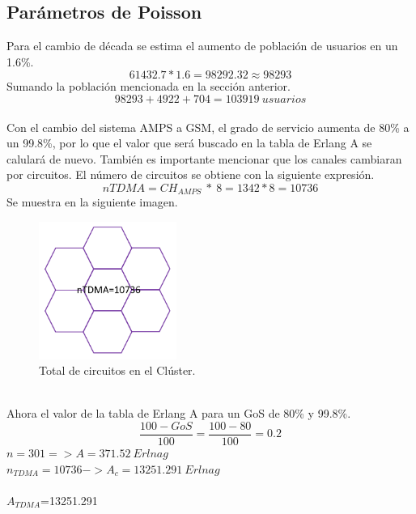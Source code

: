 \documentclass[11pt,letterpaper]{article}
\begin{document}
\subsection{Parámetros de Poisson}
Para el cambio de década se estima el aumento de población de usuarios en un 1.6\%.
\begin{equation}
    61432.7*1.6=98292.32\approx 98293
\end{equation}
Sumando la población mencionada en la sección anterior.
\begin{equation}
    98293 + 4922 + 704 = 103919 \ usuarios
\end{equation}
\\
Con el cambio del sistema AMPS a GSM, el grado de servicio aumenta de 80\% a un 99.8\%, por 
lo que el valor que será buscado en la tabla de Erlang A se calulará de nuevo. También es 
importante mencionar que los canales cambiaran por circuitos. El número de circuitos se 
obtiene con la siguiente expresión. 
\begin{equation}
    nTDMA=CH_{AMPS} \ * \ 8=1342*8=10736
\end{equation}
Se muestra en la siguiente imagen.
\begin{figure}[ht]
    \centering
    \includegraphics[width=0.4\textwidth]{imagenes/t32.png}
    \caption{Total de circuitos en el Clúster.}
\end{figure}
\\
Ahora el valor de la tabla de Erlang A para un GoS de 80\% y 99.8\%.
\begin{equation}
    \frac{100-GoS}{100}=\frac{100-80}{100}=0.2
\end{equation}
$n=301 => A=371.52 \ Erlnag$
\\ 
$n_{TDMA}=10736->A_c=13251.291 \ Erlnag$
\\ \\
$A_{TDMA}$=13251.291
\end{document}
